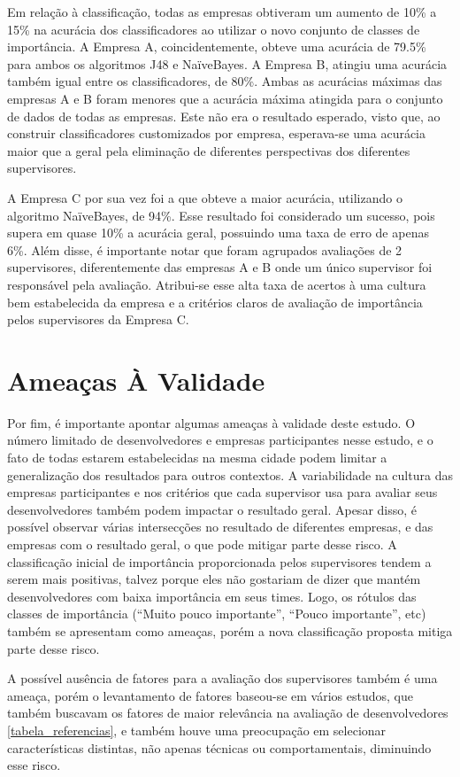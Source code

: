 Em relação à classificação, todas as empresas obtiveram um aumento de 10\% a 15\% na acurácia dos classificadores ao utilizar o novo conjunto de classes de importância. A Empresa A, coincidentemente, obteve uma acurácia de 79.5\% para ambos os algoritmos J48 e NaïveBayes. A Empresa B, atingiu uma acurácia também igual entre os classificadores, de 80\%. Ambas as acurácias máximas das empresas A e B foram menores que a acurácia máxima atingida para o conjunto de dados de todas as empresas. Este não era o resultado esperado, visto que, ao construir classificadores customizados por empresa, esperava-se uma acurácia maior que a geral pela eliminação de diferentes perspectivas dos diferentes supervisores.

A Empresa C por sua vez foi a que obteve a maior acurácia, utilizando o algoritmo NaïveBayes, de 94\%. Esse resultado foi considerado um sucesso, pois supera em quase 10\% a acurácia geral, possuindo uma taxa de erro de apenas 6\%. Além disse, é importante notar que foram agrupados avaliações de 2 supervisores, diferentemente das empresas A e B onde um único supervisor foi responsável pela avaliação. Atribui-se esse alta taxa de acertos à uma cultura bem estabelecida da empresa e a critérios claros de avaliação de importância pelos supervisores da Empresa C.

\section{Ameaças À Validade}

Por fim, é importante apontar algumas ameaças à validade deste estudo. O número limitado de desenvolvedores e empresas participantes nesse estudo, e o fato de todas estarem estabelecidas na mesma cidade podem limitar a generalização dos resultados para outros contextos. A variabilidade na cultura das empresas participantes e nos critérios que cada supervisor usa para avaliar seus desenvolvedores também podem impactar o resultado geral. Apesar disso, é possível observar várias intersecções no resultado de diferentes empresas, e das empresas com o resultado geral, o que pode mitigar parte desse risco. A classificação inicial de importância proporcionada pelos supervisores tendem a serem mais positivas, talvez porque eles não gostariam de dizer que mantém desenvolvedores com baixa importância em seus times. Logo, os rótulos das classes de importância (``Muito pouco importante'', ``Pouco importante'', etc) também se apresentam como ameaças, porém a nova classificação proposta mitiga parte desse risco.

A possível ausência de fatores para a avaliação dos supervisores também é uma ameaça, porém o levantamento de fatores baseou-se em vários estudos, que também buscavam os fatores de maior relevância na avaliação de desenvolvedores \autoref{tabela_referencias}, e também houve uma preocupação em selecionar características distintas, não apenas técnicas ou comportamentais, diminuindo esse risco.